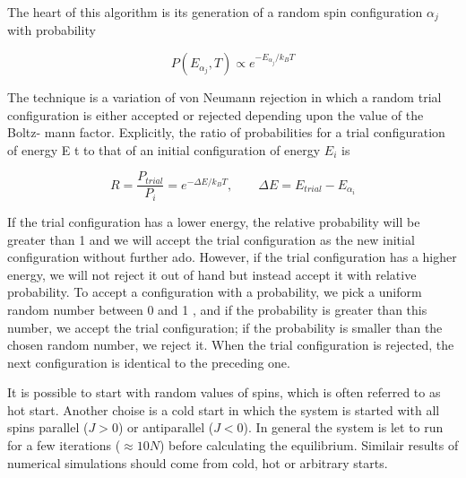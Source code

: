 \documentclass[12pt]{article}
\theoremstyle{plain}
\begin{document}
\vspace{2mm}

\par The heart of this algorithm is its generation of a random spin configuration $\alpha_j$ with
probability

\vspace{2mm}

\begin{equation*}
    P(E_{\alpha_j}, T) \propto e^{-E_{\alpha_j} / k_B T}
\end{equation*}

\vspace{2mm}

\par The technique is a variation of von Neumann rejection in which a
random trial configuration is either accepted or rejected depending upon the value of the Boltz-
mann factor. Explicitly, the ratio of probabilities for a trial configuration of energy E t to that
of an initial configuration of energy $E_i$ is

\vspace{2mm}

\begin{equation*}
    R = \frac{P_{trial}}{P_i} = e^{-\Delta E / k_B T}, \quad \quad \Delta E = E_{trial} - E_{\alpha_i}
\end{equation*}

\vspace{2mm}

\par If the trial configuration has a lower energy, the relative probability will be greater
than 1 and we will accept the trial configuration as the new initial configuration without further
ado. However, if the trial configuration has a higher energy, we will not reject it out
of hand but instead accept it with relative probability. To accept
a configuration with a probability, we pick a uniform random number between 0 and 1 , and if
the probability is greater than this number, we accept the trial configuration; if the probability
is smaller than the chosen random number, we reject it. When the trial
configuration is rejected, the next configuration is identical to the preceding one.

\vspace{2mm}

\par It is possible to start with random values of spins, which is often referred to as hot start.
Another choise is a cold start in which the system is started with all spins parallel ($J > 0$)
or antiparallel ($J < 0$). In general the system is let to run for a few iterations ($\approx 10N$)
before calculating the equilibrium. Similair results of numerical simulations should come from cold, hot
or arbitrary starts. \cite{landau}

\newpage



\end{document}
